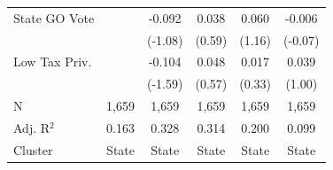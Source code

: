 \begin{tabular*}{\textwidth}{@{\extracolsep{\fill}}lccccc}
   State GO Vote        &               & -0.092         & 0.038          & 0.060          & -0.006\\   
                        &               & (-1.08)       & (0.59)        & (1.16)        & (-0.07)\\   
   Low Tax Priv.        &               & -0.104         & 0.048          & 0.017          & 0.039\\   
                        &               & (-1.59)       & (0.57)        & (0.33)        & (1.00)\\   
   \hline
   N         & 1,659         & 1,659          & 1,659          & 1,659          & 1,659\\  
   Adj. R$^2$       & 0.163         & 0.328          & 0.314          & 0.200          & 0.099\\  
   Cluster              & State & State & State & State & State\\  
   \bottomrule
\end{tabular*}
\par\endgroup
